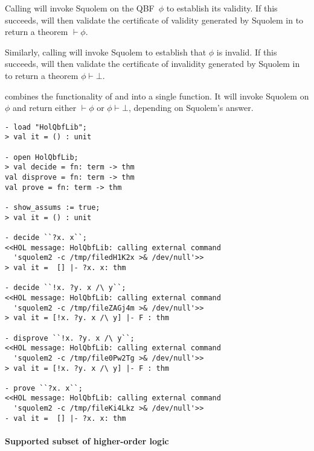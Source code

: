 Calling  will invoke Squolem on the QBF~$\phi$ to
establish its validity.  If this succeeds,  will then
validate the certificate of validity generated by Squolem in \HOL{} to
return a theorem $\vdash \phi$.

Similarly, calling  will invoke Squolem to
establish that $\phi$ is invalid.  If this succeeds, 
will then validate the certificate of invalidity generated by Squolem
in \HOL{} to return a theorem $\phi \vdash \bot$.

 combines the functionality of  and
 into a single function.  It will invoke Squolem on
$\phi$ and return either $\vdash \phi$ or $\phi \vdash \bot$,
depending on Squolem's answer.

\begin{session}
\begin{verbatim}
- load "HolQbfLib";
> val it = () : unit

- open HolQbfLib;
> val decide = fn: term -> thm
val disprove = fn: term -> thm
val prove = fn: term -> thm

- show_assums := true;
> val it = () : unit

- decide ``?x. x``;
<<HOL message: HolQbfLib: calling external command
  'squolem2 -c /tmp/filedH1K2x >& /dev/null'>>
> val it =  [] |- ?x. x: thm

- decide ``!x. ?y. x /\ y``;
<<HOL message: HolQbfLib: calling external command
  'squolem2 -c /tmp/fileZAGj4m >& /dev/null'>>
> val it = [!x. ?y. x /\ y] |- F : thm

- disprove ``!x. ?y. x /\ y``;
<<HOL message: HolQbfLib: calling external command
  'squolem2 -c /tmp/file0Pw2Tg >& /dev/null'>>
> val it = [!x. ?y. x /\ y] |- F : thm

- prove ``?x. x``;
<<HOL message: HolQbfLib: calling external command
  'squolem2 -c /tmp/fileKi4Lkz >& /dev/null'>>
- val it =  [] |- ?x. x: thm
\end{verbatim}
\end{session}

\paragraph{Supported subset of higher-order logic}

